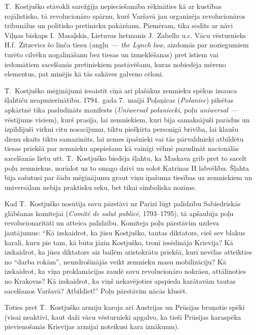 \documentclass[twoside,a5paper,12pt,fleqn,openany]{extbook}
\newcommand{\pltxti}[1]{\textit{\textpolish{#1}}}
\newcommand{\frtxti}[1]{\textit{\textfrench{#1}}}
\newcommand{\entxti}[1]{\textit{\textenglish{#1}}}
\begin{document}
T.~Kostjuško stāvokli sarežģīja nepieciešamība rēķināties kā ar kustības rojālistisko, tā revolucionāro spārnu, kurš Varšavā jau organizēja revolucionāros tribunālus un politisko pretinieku pakāršanu. Piemēram, tika sodīts ar nāvi Viļņas bīskaps I.~Masaļskis, Lietuvas hetmanis J.~Zabello u.c. Vācu vēsturnieks H.f.~Zitzevics šo linča tiesu (angļu~--- \entxti{the Lynch law}, aizdomās par noziegumiem turēto cilvēku nogalināšanu bez tiesas un izmeklēšanas) pret īstiem vai iedomātiem sacelšanās pretiniekiem pastāvēšanu, kuras nobiedēja mēreno elementus, pat minējis kā tās sakāves galveno cēloni.

T.~Kostjuško mēģinājumi iesaistīt cīņā arī plašākus zemnieku spēkus izsauca šļahtiču neapmierinātību. 1794.~gada 7.~maijā Poļaņicas (\pltxti{Połaniec}) pilsētas apkārtnē tika pasludināts manifests (\pltxti{Uniwersał połaniecki}, poļu \pltxti{uniwersal}~--- vēstījums visiem), kurš prasīja, lai zemniekiem, kuri bija samaksājuši parādus un izpildījuši virkni citu nosacījumu, tiktu piešķirta personīgā brīvība, lai klaušu dienu skaits tiktu samazināts, lai zemes īpašnieki vai tās pārvaldnieki atbildētu tiesas priekšā par zemnieku apspiešanu kā vainīgi vēlmē pazudināt nacionālās sacelšanās lietu utt. T.~Kostjuško biedēja šļahtu, ka Maskava grib pret to sacelt poļu zemniekus, norādot uz to smago dzīvi un solot Katrīnas II labvēlību. Šļahta bija sašutusi par šādu mēģinājumu graut viņu īpašuma tiesības uz zemniekiem un universālam nebija praktisku seku, bet tikai simboliska nozīme.

Kad T.~Kostjuško nosūtīja savu pārstāvi uz Parīzi lūgt palīdzību Sabiedriskās glābšanas komitejai (\frtxti{Comité de salut publicē}, 1793--1795), tā apšaubīja poļu revolucionaritāti un atteica palīdzību. Komiteja poļu pārstāvim uzdeva jautājumus: ``Kā izskaidrot, ka jūsu Kostjuško, tautas diktators, cieš sev blakus karali, kuru pie tam, kā būtu jāzin Kostjuško, tronī iesēdināja Krievija? Kā izskaidrot, ka jūsu diktators aiz bailēm aristokrātu priekšā, kuri nevēlas atteikties no ``darba rokām'', neuzdrošinājās veikt zemnieku masu mobilizāciju? Kā izskaidrot, ka viņa proklamācijas zaudē savu revolucionāro nokrāsu, attālinoties no Krakovas? Kā izskaidrot, ka viņš nekavējoties apspieda karātavām tautas sacelšanos Varšavā? Atbildiet!'' Poļu pārstāvim nācās klusēt.

Toties pret T.~Kostjuško armiju karoja arī Austrijas un Prūsijas bruņotie spēki (visai neaktīvi, kaut daži vācu vēsturnieki apgalvo, ka tieši Prūsijas karaspēka pievienošanās Krievijas armijai noteikusi kara iznākumu).
\end{document}
